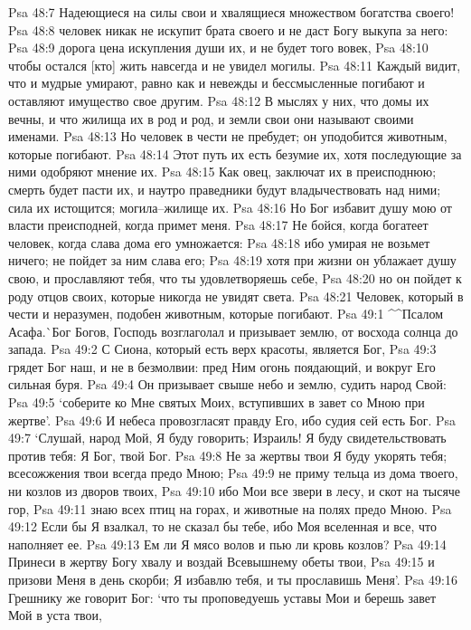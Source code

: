 Psa 48:7  Надеющиеся на силы свои и хвалящиеся множеством богатства своего!
Psa 48:8  человек никак не искупит брата своего и не даст Богу выкупа за него:
Psa 48:9  дорога цена искупления души их, и не будет того вовек,
Psa 48:10  чтобы остался [кто] жить навсегда и не увидел могилы.
Psa 48:11  Каждый видит, что и мудрые умирают, равно как и невежды и бессмысленные погибают и оставляют имущество свое другим.
Psa 48:12  В мыслях у них, что домы их вечны, и что жилища их в род и род, и земли свои они называют своими именами.
Psa 48:13  Но человек в чести не пребудет; он уподобится животным, которые погибают.
Psa 48:14  Этот путь их есть безумие их, хотя последующие за ними одобряют мнение их.
Psa 48:15  Как овец, заключат их в преисподнюю; смерть будет пасти их, и наутро праведники будут владычествовать над ними; сила их истощится; могила--жилище их.
Psa 48:16  Но Бог избавит душу мою от власти преисподней, когда примет меня.
Psa 48:17  Не бойся, когда богатеет человек, когда слава дома его умножается:
Psa 48:18  ибо умирая не возьмет ничего; не пойдет за ним слава его;
Psa 48:19  хотя при жизни он ублажает душу свою, и прославляют тебя, что ты удовлетворяешь себе,
Psa 48:20  но он пойдет к роду отцов своих, которые никогда не увидят света.
Psa 48:21  Человек, который в чести и неразумен, подобен животным, которые погибают.
Psa 49:1  ^^Псалом Асафа.^^ Бог Богов, Господь возглаголал и призывает землю, от восхода солнца до запада.
Psa 49:2  С Сиона, который есть верх красоты, является Бог,
Psa 49:3  грядет Бог наш, и не в безмолвии: пред Ним огонь поядающий, и вокруг Его сильная буря.
Psa 49:4  Он призывает свыше небо и землю, судить народ Свой:
Psa 49:5  `соберите ко Мне святых Моих, вступивших в завет со Мною при жертве'.
Psa 49:6  И небеса провозгласят правду Его, ибо судия сей есть Бог.
Psa 49:7  `Слушай, народ Мой, Я буду говорить; Израиль! Я буду свидетельствовать против тебя: Я Бог, твой Бог.
Psa 49:8  Не за жертвы твои Я буду укорять тебя; всесожжения твои всегда предо Мною;
Psa 49:9  не приму тельца из дома твоего, ни козлов из дворов твоих,
Psa 49:10  ибо Мои все звери в лесу, и скот на тысяче гор,
Psa 49:11  знаю всех птиц на горах, и животные на полях предо Мною.
Psa 49:12  Если бы Я взалкал, то не сказал бы тебе, ибо Моя вселенная и все, что наполняет ее.
Psa 49:13  Ем ли Я мясо волов и пью ли кровь козлов?
Psa 49:14  Принеси в жертву Богу хвалу и воздай Всевышнему обеты твои,
Psa 49:15  и призови Меня в день скорби; Я избавлю тебя, и ты прославишь Меня'.
Psa 49:16  Грешнику же говорит Бог: `что ты проповедуешь уставы Мои и берешь завет Мой в уста твои,
